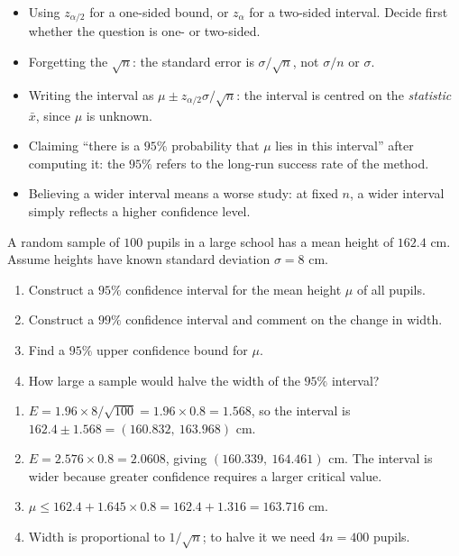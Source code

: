\documentclass[11pt]{article}
\begin{document}
\begin{attention}
\begin{itemize}
\item Using $z_{\alpha/2}$ for a one-sided bound, or $z_{\alpha}$ for a two-sided interval. Decide first whether the question is one- or two-sided.
\item Forgetting the $\sqrt{n}$: the standard error is $\sigma/\sqrt{n}$, not $\sigma/n$ or $\sigma$.
\item Writing the interval as $\mu \pm z_{\alpha/2}\sigma/\sqrt{n}$: the interval is centred on the \emph{statistic} $\bar{x}$, since $\mu$ is unknown.
\item Claiming ``there is a $95\%$ probability that $\mu$ lies in this interval'' after computing it: the $95\%$ refers to the long-run success rate of the method.
\item Believing a wider interval means a worse study: at fixed $n$, a wider interval simply reflects a higher confidence level.
\end{itemize}
\end{attention}

\begin{exercice}[Practice]
A random sample of $100$ pupils in a large school has a mean height of $162.4$ cm. Assume heights have known standard deviation $\sigma = 8$ cm.
\begin{enumerate}
\item Construct a $95\%$ confidence interval for the mean height $\mu$ of all pupils.
\item Construct a $99\%$ confidence interval and comment on the change in width.
\item Find a $95\%$ upper confidence bound for $\mu$.
\item How large a sample would halve the width of the $95\%$ interval?
\end{enumerate}
\end{exercice}

\begin{corrige}[Exercise 1]
\begin{enumerate}
\item $E = 1.96 \times 8/\sqrt{100} = 1.96 \times 0.8 = 1.568$, so the interval is $162.4 \pm 1.568 = (160.832,\ 163.968)$ cm.
\item $E = 2.576 \times 0.8 = 2.0608$, giving $(160.339,\ 164.461)$ cm. The interval is wider because greater confidence requires a larger critical value.
\item $\mu \le 162.4 + 1.645 \times 0.8 = 162.4 + 1.316 = 163.716$ cm.
\item Width is proportional to $1/\sqrt{n}$; to halve it we need $4n = 400$ pupils.
\end{enumerate}
\end{corrige}
\end{document}

